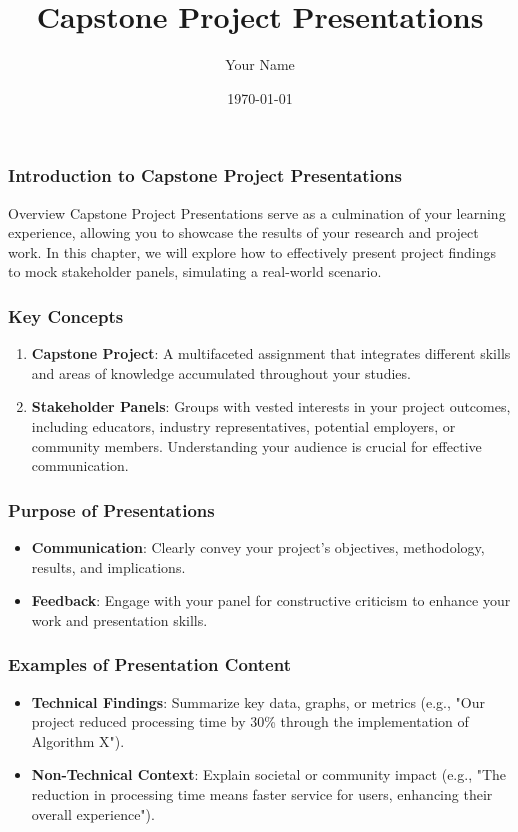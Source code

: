 \documentclass{beamer}
\title{Capstone Project Presentations}
\author{Your Name}
\institute{Your Institution}
\date{\today}
\begin{document}
\frame{\titlepage}

\begin{frame}[fragile]
    \frametitle{Introduction to Capstone Project Presentations}
    \begin{block}{Overview}
        Capstone Project Presentations serve as a culmination of your learning experience, allowing you to showcase the results of your research and project work. 
        In this chapter, we will explore how to effectively present project findings to mock stakeholder panels, simulating a real-world scenario.
    \end{block}
\end{frame}

\begin{frame}[fragile]
    \frametitle{Key Concepts}
    \begin{enumerate}
        \item \textbf{Capstone Project}: A multifaceted assignment that integrates different skills and areas of knowledge accumulated throughout your studies.
        
        \item \textbf{Stakeholder Panels}: Groups with vested interests in your project outcomes, including educators, industry representatives, potential employers, or community members. Understanding your audience is crucial for effective communication.
    \end{enumerate}
\end{frame}

\begin{frame}[fragile]
    \frametitle{Purpose of Presentations}
    \begin{itemize}
        \item \textbf{Communication}: Clearly convey your project's objectives, methodology, results, and implications.
        \item \textbf{Feedback}: Engage with your panel for constructive criticism to enhance your work and presentation skills.
    \end{itemize}
\end{frame}

\begin{frame}[fragile]
    \frametitle{Examples of Presentation Content}
    \begin{itemize}
        \item \textbf{Technical Findings}: Summarize key data, graphs, or metrics (e.g., "Our project reduced processing time by 30\% through the implementation of Algorithm X").
        
        \item \textbf{Non-Technical Context}: Explain societal or community impact (e.g., "The reduction in processing time means faster service for users, enhancing their overall experience").
    \end{itemize}
\end{frame}
\end{document}
